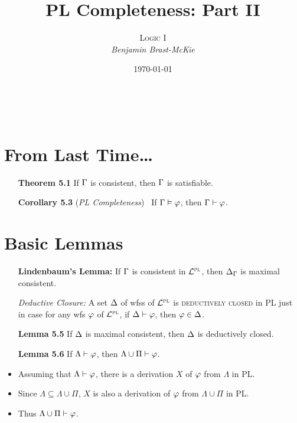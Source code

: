 \documentclass[a4paper, 11pt]{article} %
\title{\textbf{PL Completeness: Part II}} %
\author{\textsc{Logic I}\\ \em Benjamin Brast-McKie} %
\date{\today} %
\makeatletter
\renewcommand{\maketitle}{
\begin{flushright}
{\LARGE\@title}

\vspace{10pt}

{\@author}
\\ \@date
\end{flushright}

\vspace{20pt}

}
\makeatother
\begin{document}
\maketitle %

\thispagestyle{empty}


\section*{From Last Time\ldots}

\begin{itemize}
  \item[\bf Theorem 5.1] If $\Gamma$ is consistent, then $\Gamma$ is satisfiable.
  \item[\bf Corollary 5.3] (\textit{PL Completeness})~ If $\Gamma\vDash\varphi$, then $\Gamma\vdash\varphi$.
\end{itemize}




\section*{Basic Lemmas}

\begin{itemize}
  \item[\bf Lindenbaum's Lemma:] If $\Gamma$ is consistent in $\mathcal{L}^{\textsc{pl}}$, then $\Delta_{\Gamma}$ is maximal consistent. 
  \item[\it Deductive Closure:] A set $\Delta$ of wfss of $\mathcal{L}^{\textsc{pl}}$ is \textsc{deductively closed} in PL just in case for any wfs $\varphi$ of $\mathcal{L}^{\textsc{pl}}$, if $\Delta\vdash\varphi$, then $\varphi\in\Delta$.
  \item[\bf Lemma 5.5] If $\Delta$ is maximal consistent, then $\Delta$ is deductively closed.
  \item[\bf Lemma 5.6] If $\Lambda\vdash\varphi$, then $\Lambda\cup\Pi\vdash\varphi$.
    \item Assuming that $\Lambda\vdash\varphi$, there is a derivation $X$ of $\varphi$ from $\Lambda$ in PL.
    \item Since $\Lambda\subseteq\Lambda\cup\Pi$, $X$ is also a derivation of $\varphi$ from $\Lambda\cup\Pi$ in PL.
    \item Thus $\Lambda\cup\Pi\vdash\varphi$. 
\end{itemize}
\end{document}
